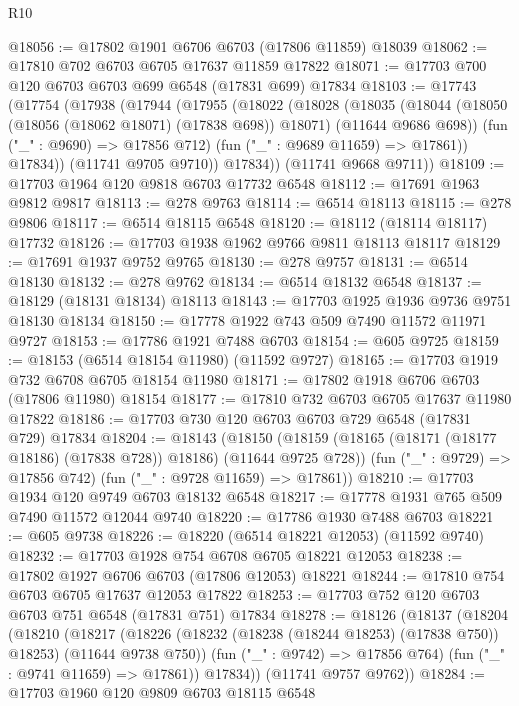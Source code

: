\begin{lexlean}{R10}
\begin{coremodule}
{{{{{{{{{{{{{{{{{{{{{{{{{{{{{{{{{{{{{{{{{{{{{{{{{{{{{{{{{{{{{{{{{{{{{{{{{{{{{{{{{{{{@18056 := @17802 @1901 @6706 @6703 (@17806 @11859) @18039
@18062 := @17810 @702 @6703 @6705 @17637 @11859 @17822
@18071 := @17703 @700 @120 @6703 @6703 @699 @6548 (@17831 @699) @17834
@18103 := @17743
    (@17754
      (@17938
        (@17944
          (@17955
            (@18022
              (@18028
                (@18035
                  (@18044
                    (@18050 (@18056 (@18062 @18071) (@17838 @698)) @18071)
                    (@11644 @9686 @698))
                  (fun ("_" : @9690) => @17856 @712)
                  (fun ("_" : @9689 @11659) => @17861))
                @17834))
            (@11741 @9705 @9710))
          @17834))
      (@11741 @9668 @9711))
@18109 := @17703 @1964 @120 @9818 @6703 @17732 @6548
@18112 := @17691 @1963 @9812 @9817
@18113 := @278 @9763
@18114 := @6514 @18113
@18115 := @278 @9806
@18117 := @6514 @18115 @6548
@18120 := @18112 (@18114 @18117) @17732
@18126 := @17703 @1938 @1962 @9766 @9811 @18113 @18117
@18129 := @17691 @1937 @9752 @9765
@18130 := @278 @9757
@18131 := @6514 @18130
@18132 := @278 @9762
@18134 := @6514 @18132 @6548
@18137 := @18129 (@18131 @18134) @18113
@18143 := @17703 @1925 @1936 @9736 @9751 @18130 @18134
@18150 := @17778 @1922 @743 @509 @7490 @11572 @11971 @9727
@18153 := @17786 @1921 @7488 @6703
@18154 := @605 @9725
@18159 := @18153 (@6514 @18154 @11980) (@11592 @9727)
@18165 := @17703 @1919 @732 @6708 @6705 @18154 @11980
@18171 := @17802 @1918 @6706 @6703 (@17806 @11980) @18154
@18177 := @17810 @732 @6703 @6705 @17637 @11980 @17822
@18186 := @17703 @730 @120 @6703 @6703 @729 @6548 (@17831 @729) @17834
@18204 := @18143
    (@18150
      (@18159 (@18165 (@18171 (@18177 @18186) (@17838 @728)) @18186) (@11644 @9725 @728))
      (fun ("_" : @9729) => @17856 @742)
      (fun ("_" : @9728 @11659) => @17861))
@18210 := @17703 @1934 @120 @9749 @6703 @18132 @6548
@18217 := @17778 @1931 @765 @509 @7490 @11572 @12044 @9740
@18220 := @17786 @1930 @7488 @6703
@18221 := @605 @9738
@18226 := @18220 (@6514 @18221 @12053) (@11592 @9740)
@18232 := @17703 @1928 @754 @6708 @6705 @18221 @12053
@18238 := @17802 @1927 @6706 @6703 (@17806 @12053) @18221
@18244 := @17810 @754 @6703 @6705 @17637 @12053 @17822
@18253 := @17703 @752 @120 @6703 @6703 @751 @6548 (@17831 @751) @17834
@18278 := @18126
    (@18137
      (@18204
        (@18210
          (@18217
            (@18226 (@18232 (@18238 (@18244 @18253) (@17838 @750)) @18253) (@11644 @9738 @750))
            (fun ("_" : @9742) => @17856 @764)
            (fun ("_" : @9741 @11659) => @17861))
          @17834))
      (@11741 @9757 @9762))
@18284 := @17703 @1960 @120 @9809 @6703 @18115 @6548
}}}}}}}}}}}}}}}}}}}}}}}}}}}}}}}}}}}}}}}}}}}}}}}}}}}}}}}}}}}}}}}}}}}}}}}}}}}}}}}}}}}}
\end{coremodule}
\end{lexlean}
